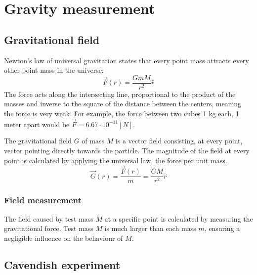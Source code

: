 \documentclass[\main/master.tex]{subfiles}
\begin{document}
\section{Gravity measurement}
\subsection{Gravitational field}
Newton's law of universal gravitation states that every point mass attracts every other point mass in the universe:
\begin{equation}
\overrightarrow{F}(r) = \frac{GmM}{r^2}\hat{r}    \label{eqn:gravitation_force}
\end{equation} 
The force acts along the intersecting line, proportional to the product of the masses and inverse to the square of the distance between the centers, meaning the force is very weak. For example, the force between two cubes 1 kg each, 1 meter apart would be $\overrightarrow{F} = 6.67\cdot10^{-11} [N]$.
\par\noindent
The gravitational field $G$ of mass $M$ is a vector field consisting, at every point, vector pointing directly towards the particle. The magnitude of the field at every point is calculated by applying the universal law, the force per unit mass. 
\begin{equation}
\overrightarrow{G}(r) = \frac{\overrightarrow{F}(r)}{m} = \frac{GM}{r^2}\hat{r}    \label{eqn:gravitation_field}
\end{equation}
\subsubsection{Field measurement}
\par\noindent
The field caused by test mass $M$ at a specific point is calculated by measuring the gravitational force. Test mass $M$ is much larger than each mass $m$, ensuring a negligible influence on the behaviour of $M$.  

\subsection{Cavendish experiment}
\end{document}
